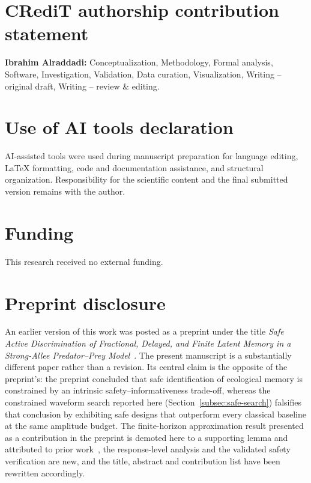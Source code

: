\documentclass[preprint,12pt]{elsarticle}
\numberwithin{equation}{section}
\theoremstyle{plain}
\theoremstyle{definition}
\theoremstyle{remark}
\begin{document}












\section*{CRediT authorship contribution statement}
\textbf{Ibrahim Alraddadi:} Conceptualization, Methodology, Formal analysis, Software, Investigation, Validation, Data curation, Visualization, Writing -- original draft, Writing -- review \& editing.

\section*{Use of AI tools declaration}
AI-assisted tools were used during manuscript preparation for language editing, LaTeX formatting, code and documentation assistance, and structural organization. Responsibility for the scientific content and the final submitted version remains with the author.

\section*{Funding}
This research received no external funding.

\section*{Preprint disclosure}
An earlier version of this work was posted as a preprint under the title \emph{Safe Active Discrimination of Fractional, Delayed, and Finite Latent Memory in a Strong-Allee Predator--Prey Model}~\cite{PREPRINT01}. The present manuscript is a substantially different paper rather than a revision. Its central claim is the opposite of the preprint's: the preprint concluded that safe identification of ecological memory is constrained by an intrinsic safety--informativeness trade-off, whereas the constrained waveform search reported here (Section~\ref{subsec:safe-search}) falsifies that conclusion by exhibiting safe designs that outperform every classical baseline at the same amplitude budget. The finite-horizon approximation result presented as a contribution in the preprint is demoted here to a supporting lemma and attributed to prior work~\cite{K07}, the response-level analysis and the validated safety verification are new, and the title, abstract and contribution list have been rewritten accordingly.
\end{document}

